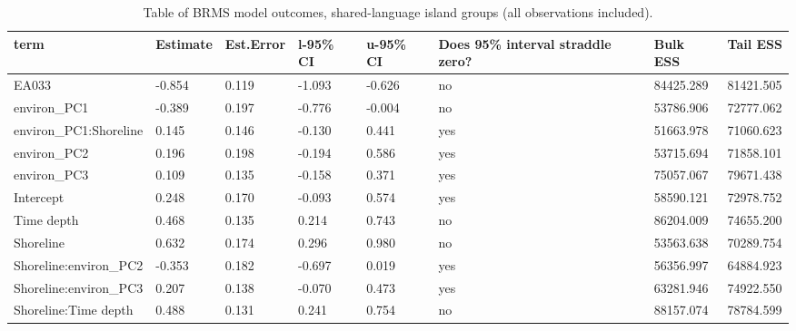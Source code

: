 \begin{table}[ht]
\centering
\begin{tabular}{p{5cm}p{2cm}p{2cm}p{2cm}p{2cm}p{2cm}p{2cm}p{2cm}}
  \toprule
term & Estimate & Est.Error & l-95\% CI & u-95\% CI & Does 95\% interval straddle zero? & Bulk ESS & Tail ESS \\ 
  \midrule
EA033 & -0.854 & 0.119 & -1.093 & -0.626 & no & 84425.289 & 81421.505 \\ 
  environ\_PC1 & -0.389 & 0.197 & -0.776 & -0.004 & no & 53786.906 & 72777.062 \\ 
  environ\_PC1:Shoreline & 0.145 & 0.146 & -0.130 & 0.441 & yes & 51663.978 & 71060.623 \\ 
  environ\_PC2 & 0.196 & 0.198 & -0.194 & 0.586 & yes & 53715.694 & 71858.101 \\ 
  environ\_PC3 & 0.109 & 0.135 & -0.158 & 0.371 & yes & 75057.067 & 79671.438 \\ 
  Intercept & 0.248 & 0.170 & -0.093 & 0.574 & yes & 58590.121 & 72978.752 \\ 
  Time depth & 0.468 & 0.135 & 0.214 & 0.743 & no & 86204.009 & 74655.200 \\ 
  Shoreline & 0.632 & 0.174 & 0.296 & 0.980 & no & 53563.638 & 70289.754 \\ 
  Shoreline:environ\_PC2 & -0.353 & 0.182 & -0.697 & 0.019 & yes & 56356.997 & 64884.923 \\ 
  Shoreline:environ\_PC3 & 0.207 & 0.138 & -0.070 & 0.473 & yes & 63281.946 & 74922.550 \\ 
  Shoreline:Time depth & 0.488 & 0.131 & 0.241 & 0.754 & no & 88157.074 & 78784.599 \\ 
   \bottomrule
\end{tabular}
\caption{Table of BRMS model outcomes, shared-language island groups (all observations included).} 
\label{BRMS_effects_medium}
\end{table}
